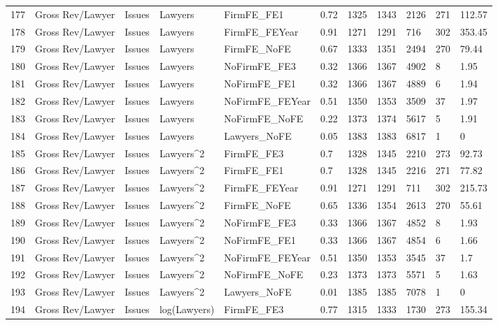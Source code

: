 \begin{table}[ht]
\begin{tabular}{rllllllllll}
  177 & Gross Rev/Lawyer & Issues & Lawyers & FirmFE\_FE1 & 0.72 & 1325 & 1343 & 2126 & 271 & 112.57 \\ 
  178 & Gross Rev/Lawyer & Issues & Lawyers & FirmFE\_FEYear & 0.91 & 1271 & 1291 & 716 & 302 & 353.45 \\ 
  179 & Gross Rev/Lawyer & Issues & Lawyers & FirmFE\_NoFE & 0.67 & 1333 & 1351 & 2494 & 270 & 79.44 \\ 
  180 & Gross Rev/Lawyer & Issues & Lawyers & NoFirmFE\_FE3 & 0.32 & 1366 & 1367 & 4902 & 8 & 1.95 \\ 
  181 & Gross Rev/Lawyer & Issues & Lawyers & NoFirmFE\_FE1 & 0.32 & 1366 & 1367 & 4889 & 6 & 1.94 \\ 
  182 & Gross Rev/Lawyer & Issues & Lawyers & NoFirmFE\_FEYear & 0.51 & 1350 & 1353 & 3509 & 37 & 1.97 \\ 
  183 & Gross Rev/Lawyer & Issues & Lawyers & NoFirmFE\_NoFE & 0.22 & 1373 & 1374 & 5617 & 5 & 1.91 \\ 
  184 & Gross Rev/Lawyer & Issues & Lawyers & Lawyers\_NoFE & 0.05 & 1383 & 1383 & 6817 & 1 & 0 \\ 
  185 & Gross Rev/Lawyer & Issues & Lawyers^2 & FirmFE\_FE3 & 0.7 & 1328 & 1345 & 2210 & 273 & 92.73 \\ 
  186 & Gross Rev/Lawyer & Issues & Lawyers^2 & FirmFE\_FE1 & 0.7 & 1328 & 1345 & 2216 & 271 & 77.82 \\ 
  187 & Gross Rev/Lawyer & Issues & Lawyers^2 & FirmFE\_FEYear & 0.91 & 1271 & 1291 & 711 & 302 & 215.73 \\ 
  188 & Gross Rev/Lawyer & Issues & Lawyers^2 & FirmFE\_NoFE & 0.65 & 1336 & 1354 & 2613 & 270 & 55.61 \\ 
  189 & Gross Rev/Lawyer & Issues & Lawyers^2 & NoFirmFE\_FE3 & 0.33 & 1366 & 1367 & 4852 & 8 & 1.93 \\ 
  190 & Gross Rev/Lawyer & Issues & Lawyers^2 & NoFirmFE\_FE1 & 0.33 & 1366 & 1367 & 4854 & 6 & 1.66 \\ 
  191 & Gross Rev/Lawyer & Issues & Lawyers^2 & NoFirmFE\_FEYear & 0.51 & 1350 & 1353 & 3545 & 37 & 1.7 \\ 
  192 & Gross Rev/Lawyer & Issues & Lawyers^2 & NoFirmFE\_NoFE & 0.23 & 1373 & 1373 & 5571 & 5 & 1.63 \\ 
  193 & Gross Rev/Lawyer & Issues & Lawyers^2 & Lawyers\_NoFE & 0.01 & 1385 & 1385 & 7078 & 1 & 0 \\ 
  194 & Gross Rev/Lawyer & Issues & log(Lawyers) & FirmFE\_FE3 & 0.77 & 1315 & 1333 & 1730 & 273 & 155.34 \\ 

\end{tabular}
\end{table}
